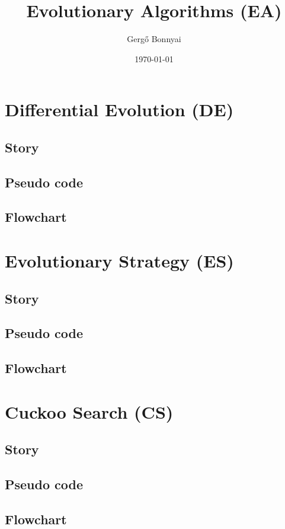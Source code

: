 \documentclass[border=0.2cm]{report}
\title{Evolutionary Algorithms (EA)}
\author{Gergő Bonnyai}
\date{\today}
\begin{document}
\maketitle

\tableofcontents
\listoffigures

\clearpage

\chapter{Differential Evolution (DE)}
\section{Story}
\section{Pseudo code}
\section{Flowchart}

\chapter{Evolutionary Strategy (ES)}
\section{Story}
\section{Pseudo code}
\section{Flowchart}

\chapter{Cuckoo Search (CS)}
\section{Story}
\section{Pseudo code}
\section{Flowchart}
\end{document}

